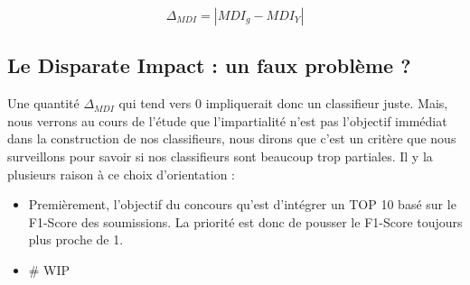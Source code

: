 $$ \Delta_{MDI} = | MDI_{g}- MDI_{Y} | $$

\subsection{Le Disparate Impact : un faux problème ?} \hfill
\newline

Une quantité $\Delta_{MDI}$ qui tend vers 0 impliquerait donc un classifieur juste. Mais, nous verrons au cours de l'étude que l'impartialité n'est pas l'objectif immédiat dans la construction de nos classifieurs, nous dirons que c'est un critère que nous surveillons pour savoir si nos classifieurs sont beaucoup trop partiales. Il y la plusieurs raison à ce choix d'orientation :

\begin{itemize}
\item Premièrement, l'objectif du concours qu'est d'intégrer un TOP 10 basé sur le F1-Score des soumissions. La priorité est donc de pousser le F1-Score toujours plus proche de 1.
\item # WIP
\end{itemize}


